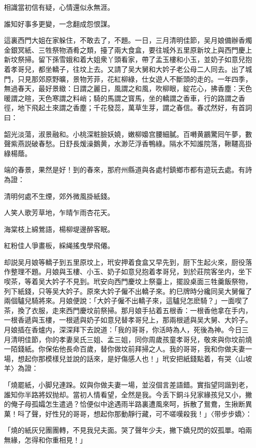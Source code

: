 \begin{myquote}
相識當初信有疑，心情還似永無涯。

誰知好事多更變，一念翻成怨恨謀。
\end{myquote}

這裏西門大姐在家躲住，不敢去了，不題。一日，三月清明佳節，吴月娘備辦香燭金銀冥紙、三牲祭物酒肴之類，擡了兩大食盒，要往城外五里原新坟上與西門慶上新坟祭掃。留下孫雪娥和着大姐衆丫頭看家，帶了孟玉樓和小玉，並奶子如意兒抱着孝哥兒，都坐轎子，往坟上去。又請了吴大舅和大妗子老公母二人同去。出了城門，只見那郊原野曠，景物芳菲，花紅柳綠，仕女遊人不斷頭的走的。一年四季，無過春天，最好景緻：日謂之麗日，風謂之和風，吹柳眼，綻花心，拂香塵：天色暖謂之暄，天色寒謂之料峭；騎的馬謂之寳馬，坐的轎謂之香車，行的路謂之香徑，地下飛起土來謂之香塵；千花發蕊，萬草生芽，謂之春信。春忒然好，有首詞曰：

\begin{myquote}
韶光淡蕩，淑景融和。小桃深粧臉妖嬈，嫩柳嬝宫腰細膩。百囀黄鸝驚囘午夢，數聲紫燕説破春愁。日舒長煖澡鵝黄，水渺茫浮香鴨綠。隔水不知誰院落，鞦韆高掛綠楊蔭。
\end{myquote}

端的春景，果然是好！到的春來，那府州縣道與各處村鎮鄉市都有遊玩去處。有詩為證：

\begin{myquote}
清明何處不生煙，郊外微風掛紙錢。

人笑人歌芳草地，乍晴乍雨杏花天。

海棠枝上綿鶯語，楊柳堤邊醉客眠。

紅粉佳人爭畫板，綵䋲搖曳學飛僊。
\end{myquote}

却説吴月娘等轎子到五里原坟上，玳安押着食盒又早先到，厨下生起火來，厨役落作整理不題。月娘與玉樓、小玉、奶子如意兒抱着孝哥兒，到於莊院客坐内，坐下喫茶，等着吴大妗子不見到。玳安向西門慶坟上祭臺上，擺設桌面三牲羹飯祭物，列下紙錢，只等吴大妗子。原來大妗子僱不出轎子來。約巳牌時分纔同吴大舅僱了兩個驢兒騎將來。月娘便說：「大妗子僱不出轎子來，這驢兒怎麽騎？」一面喫了茶，換了衣服，走來西門慶坟前祭掃。那月娘手拈着五根香：一根香他拿在手内，一根香遞與玉樓，一根遞與奶子如意兒替孝哥兒上，那兩根遞與吴大舅、大妗子。月娘插在香爐内，深深拜下去說道：「我的哥哥，你活時為人，死後為神。今日三月清明佳節，你的孝妻吴氏三姐、孟三姐，同你周歲孩童孝哥兒，敬來與你坟前燒一陌錢紙。你保佑他長命百歲，替你做坟前拜掃之人。我的哥哥，我和你做夫妻一場，想起你那模樣兒並說的話來，是好傷感人也！」玳安把紙錢點着，有哭〈山坡羊〉為證：

\begin{myquote}
「燒罷紙，小脚兒連跺。奴與你做夫妻一場，並沒個言差語錯。實指望同諧到老，誰知你半路將奴抛却。當初人情看望，全然是我。今丢下銅斗兒家緣孩兒又小，撇的俺子母孤孀怎生遣過？恰便似中途遇雨半路裏遭風來呵，拆散了鴛鴦，生揪断異菓！呌了聲，好性兒的哥哥，想起你那動靜行藏，可不嗟嘆殺我！」{\marktext\small〈带步步嬌〉}：

「燒的紙灰兒團團轉，不見我兒夫面。哭了聲年少夫，撇下嬌兒閃的奴孤單。咱兩無緣，怎得和你重相見！」
\end{myquote}

